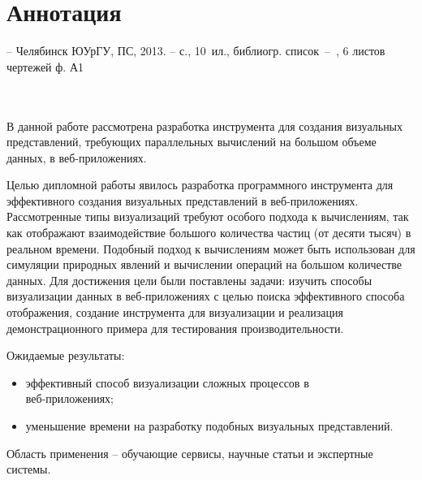 \newpage
\section*{Аннотация}

\hfill
\begin{minipage}[t]{0.62\textwidth}
  \ESKDtheAuthor \space \ESKDtheDocName -- Челябинск ЮУрГУ, ПС, 2013. --  с., 
  10~ил., библиогр. список~--~, 6 листов чертежей ф. А1
\end{minipage} \\
\\

В данной работе рассмотрена разработка инструмента для создания визуальных
представлений, требующих параллельных вычислений на большом объеме данных, 
в веб-приложениях.

Целью дипломной работы явилось разработка программного инструмента для эффективного
создания визуальных представлений в веб-приложениях. Рассмотренные типы
визуализаций требуют особого подхода к вычислениям, так как отображают
взаимодействие большого количества частиц (от десяти тысяч) в реальном времени.
Подобный подход к вычислениям может быть использован для симуляции природных явлений 
и вычислении операций на большом количестве данных. Для достижения цели были поставлены
задачи: изучить способы визуализации данных в веб-приложениях с целью поиска эффективного
способа отображения, создание инструмента для визуализации и реализация демонстрационного 
примера для тестирования производительности.

Ожидаемые результаты:

\begin{itemize}
  \item эффективный способ визуализации сложных процессов в \\веб-приложениях;
  \item уменьшение времени на разработку подобных визуальных представлений.
\end{itemize}

Область применения -- обучающие сервисы, научные статьи и экспертные системы.
